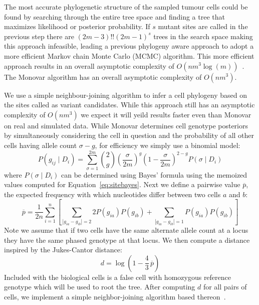 \documentclass[../../main.tex]{subfiles}
\begin{document}
The most accurate phylogenetic structure of the sampled tumour cells could be found by searching through the entire tree space and finding a tree that maximizes likelihood or posterior probability. If $s$ mutant sites are called in the previous step there are $(2m-3)!!(2m-1)^s$ trees in the search space making this approach infeasible, leading a previous phylogeny aware approach to adopt a more efficient Markov chain Monte Carlo (MCMC) algorithm. This more efficient approach results in an overall asymptotic complexity of $O(nm^3\log(m))$~\cite{sciphi}. The Monovar algorithm has an overall asymptotic complexity of $O(nm^3)$.

We use a simple neighbour-joining algorithm to infer a cell phylogeny based on the sites called as variant candidates. While this approach still has an asymptotic complexity of $O(nm^3)$ we expect it will yeild results faster even than Monovar on real and simulated data.
While Monovar determines cell genotype posteriors by simultaneously considering the cell in question and the probability of all other cells having allele count $\sigma-g$, for efficiency we simply use a binomial model:
\begin{equation*}
P(g_{ij}\mid D_i) = \sum_{\sigma=1}^{2m}\binom{2}{g}\left(\frac{\sigma}{2m}\right)^g\left(1-\frac{\sigma}{2m}\right)^{2-g}P(\sigma\mid D_i)
\end{equation*}
where $P(\sigma\mid D_i)$ can be determined using Bayes' formula using the memoized values computed for Equation~\ref{eq:sitebayes}. Next we define a pairwise value $\overline{p}$, the expected frequency with which nucleotides differ between two cells $a$ and $b$:
\begin{equation*}
\overline{p} = \frac{1}{2n}\sum_{i=1}^n\left[ \sum_{|g_{ia}-g_{ib}|=2} 2P(g_{ia})P(g_{ib}) + \sum_{|g_{ia}-g_{ib}|=1} P(g_{ia})P(g_{ib})\right]
\end{equation*}
Note we assume that if two cells have the same alternate allele count at a locus they have the same phased genotype at that locus. We then compute a distance inspired by the Jukes-Cantor distance:
\begin{equation}
d = \log \left(1-\frac{4}{3}\,\overline{p}\right)
\end{equation}
Included with the biological cells is a false cell with homozygous reference genotype which will be used to root the tree. After computing $d$ for all pairs of cells, we implement a simple neighbor-joining algorithm based thereon~\cite{BSA}.
\end{document}
